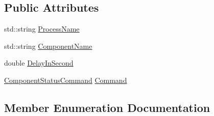\subsection*{Public Attributes}
\begin{DoxyCompactItemize}
\item 
std\+::string \hyperlink{classmts_component_status_control_af79c985b9f9820b1a8faabf58a0abf47}{Process\+Name}
\item 
std\+::string \hyperlink{classmts_component_status_control_a10e6f2dd9746957babad7a0ca081bf9c}{Component\+Name}
\item 
double \hyperlink{classmts_component_status_control_a91669bce299eebde1907da850c138c01}{Delay\+In\+Second}
\item 
\hyperlink{classmts_component_status_control_aaa1cc592d13ddd45a5cf695f72d3511f}{Component\+Status\+Command} \hyperlink{classmts_component_status_control_a689d4823e12fbae1ca81e3de0b246c40}{Command}
\end{DoxyCompactItemize}


\subsection{Member Enumeration Documentation}
\hypertarget{classmts_component_status_control_aaa1cc592d13ddd45a5cf695f72d3511f}{}
